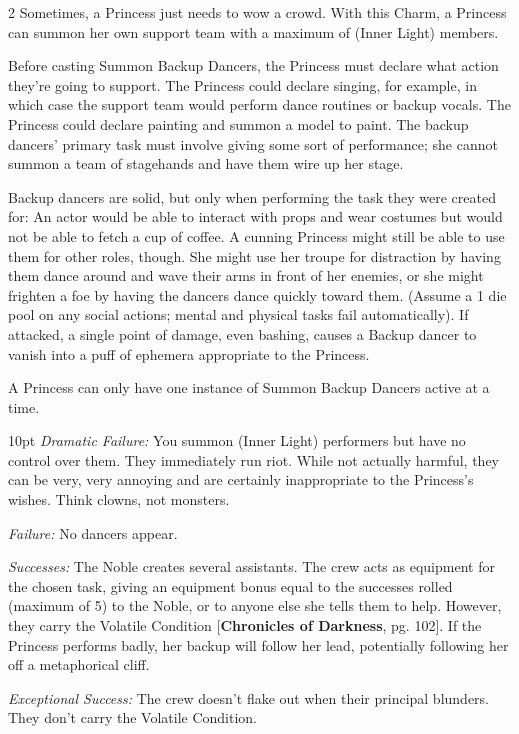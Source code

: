 \begin{multicols}{2}
\noindent Sometimes, a Princess just needs to wow a crowd. With this Charm, a Princess can summon her own support team with a maximum of (Inner Light) members.

Before casting Summon Backup Dancers, the Princess must declare what action they're going to support. The Princess could declare singing, for example, in which case the support team would perform dance routines or backup vocals. The Princess could declare painting and summon a model to paint. The backup dancers' primary task must involve giving some sort of performance; she cannot summon a team of stagehands and have them wire up her stage. 

Backup dancers are solid, but only when performing the task they were created for: An actor would be able to interact with props and wear costumes but would not be able to fetch a cup of coffee. A cunning Princess might still be able to use them for other roles, though. She might use her troupe for distraction by having them dance around and wave their arms in front of her enemies, or she might frighten a foe by having the dancers dance quickly toward them. (Assume a 1 die pool on any social actions; mental and physical tasks fail automatically). If attacked, a single point of damage, even bashing, causes a Backup dancer to vanish into a puff of ephemera appropriate to the Princess.

A Princess can only have one instance of Summon Backup Dancers active at a time.

\begin{myindentpar}{10pt}     \emph{Dramatic Failure:} You summon (Inner Light) performers but have no control over them. They immediately run riot. While not actually harmful, they can be very, very annoying and are certainly inappropriate to the Princess's wishes. Think clowns, not monsters.

    \emph{Failure:} No dancers appear.

    \emph{Successes:} The Noble creates several assistants. The crew acts as equipment for the chosen task, giving an equipment bonus equal to the successes rolled (maximum of 5) to the Noble, or to anyone else she tells them to help. However, they carry the Volatile Condition [\textbf{Chronicles of Darkness}, pg. 102]. If the Princess performs badly, her backup will follow her lead, potentially following her off a metaphorical cliff. 

    \emph{Exceptional Success:} The crew doesn’t flake out when their principal blunders. They don’t carry the Volatile Condition. \end{myindentpar}


\end{multicols}
